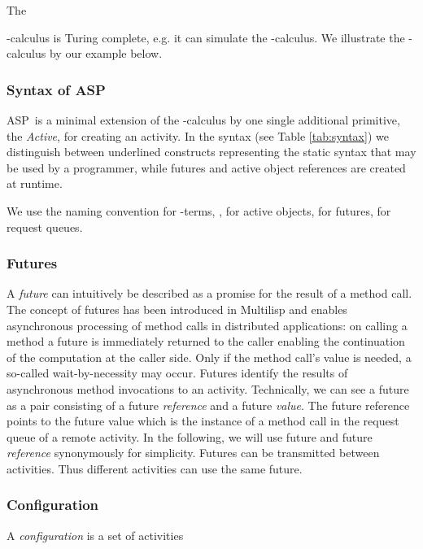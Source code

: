 \documentclass[10pt, conference, compsocconf]{IEEEtran}
\newcommand\aspfun{ASP\ }
\newcommand\aspfunp{ASP}
\begin{document}
The {-calculus is Turing complete, e.g. it can simulate the -calculus. 
We illustrate the -calculus by our example below.

\subsubsection{Syntax of \aspfunp}
\aspfun is a minimal extension of the -calculus by one single 
additional primitive, the {\it Active}, for creating an activity.
In the syntax (see Table \ref{tab:syntax}) we distinguish between underlined constructs 
representing the static syntax that may be used by a programmer, while futures and active 
object references are created at runtime.
\begin{table}[!ht]

\vspace{-3ex}
\caption{\aspfun syntax}
\label{tab:syntax}
\vspace{-3ex}
\end{table}
We use the naming convention  for -terms, ,
 for active objects,  for futures,  for request queues.


\subsubsection{Futures}
A {\it future} can intuitively be described as a promise for the result of a method call.
The concept of futures has been introduced in Multilisp \cite{Halstead85} and 
enables asynchronous processing of method calls in distributed applications:
on calling a method a future is immediately returned to the caller enabling the
continuation of the computation at the caller side. Only if the method call's value
is needed, a so-called wait-by-necessity may occur.
Futures identify the results of asynchronous method invocations to an
activity. Technically, we can see a future as a pair consisting of a future {\it reference} and a future {\it value}.
The future reference points to the future value which is the instance
of a method call in the request queue of a remote activity. 
In the following, we will use future and future {\it reference} synonymously for simplicity.
Futures can be transmitted between activities. Thus different activities 
can use the same future. 


\subsubsection{Configuration}
A {\it configuration} is a set of activities

}
\end{document}
